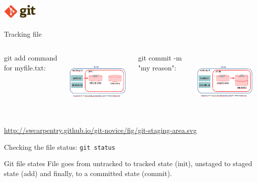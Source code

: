 \begin{frame}[containsverbatim]
\frametitle{\includegraphics[height=0.8cm]{shared/logo-git.png}}
\begin{block}{Tracking file}
\begin{columns}
git add command for myfile.txt:
 \begin{center}
   \includegraphics[height=3cm]{05_history/Images/FAIR_git_add.png}
\end{center}
git commit -m "my reason":
 \begin{center}
   \includegraphics[height=3cm]{05_history/Images/FAIR_git_commit.png}
\end{center}
\end{columns}
\tiny{\url{http://swcarpentry.github.io/git-novice/fig/git-staging-area.svg}}
\end{block}
Checking the file status: \verb|git status|
\begin{block}{Git file states}
File goes from untracked to tracked state (init), unstaged to staged state (add) and finally, to a committed state (commit).
\end{block}
\end{frame}
